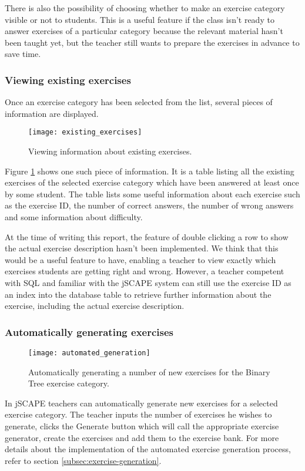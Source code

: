 There is also the possibility of choosing whether to make an exercise category visible or not to students. This is a useful feature if the class isn't ready to answer exercises of a particular category because the relevant material hasn't been taught yet, but the teacher still wants to prepare the exercises in advance to save time.
\subsubsection{Viewing existing exercises}
Once an exercise category has been selected from the list, several pieces of information are displayed.

\begin{figure}[H]
\centering
\texttt{[image: existing\_exercises]}
\caption{Viewing information about existing exercises.}
\label{fig:existing_exercises}
\end{figure}

Figure \ref{fig:existing_exercises} shows one such piece of information. It is a table listing all the existing exercises of the selected exercise category which have been answered at least once by some student. The table lists some useful information about each exercise such as the exercise ID, the number of correct answers, the number of wrong answers and some information about difficulty.\newline

At the time of writing this report, the feature of double clicking a row to show the actual exercise description hasn't been implemented. We think that this would be a useful feature to have, enabling a teacher to view exactly which exercises students are getting right and wrong. However, a teacher competent with SQL and familiar with the jSCAPE system can still use the exercise ID as an index into the database table to retrieve further information about the exercise, including the actual exercise description.

\subsubsection{Automatically generating exercises}
\begin{figure}[H]
\centering
\texttt{[image: automated\_generation]}
\caption{Automatically generating a number of new exercises for the Binary Tree exercise category.}
\label{fig:automated_generation}
\end{figure}

In jSCAPE teachers can automatically generate new exercises for a selected exercise category. The teacher inputs the number of exercises he wishes to generate, clicks the Generate button which will call the appropriate exercise generator, create the exercises and add them to the exercise bank. For more details about the implementation of the automated exercise generation process, refer to section \ref{subsec:exercise-generation}.

